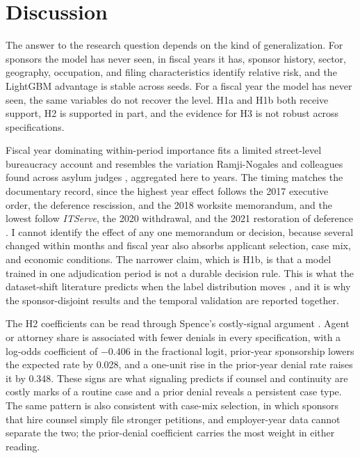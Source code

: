 \documentclass[9pt,twoside]{pnas-new}
\begin{document}
\FloatBarrier
\section*{Discussion}

The answer to the research question depends on the kind of generalization. For sponsors the model has never seen, in fiscal years it has, sponsor history, sector, geography, occupation, and filing characteristics identify relative risk, and the LightGBM advantage is stable across seeds. For a fiscal year the model has never seen, the same variables do not recover the level. H1a and H1b both receive support, H2 is supported in part, and the evidence for H3 is not robust across specifications.

Fiscal year dominating within-period importance fits a limited street-level bureaucracy account and resembles the variation Ramji-Nogales and colleagues found across asylum judges \cite{ramjinogales2007}, aggregated here to years. The timing matches the documentary record, since the highest year effect follows the 2017 executive order, the deference rescission, and the 2018 worksite memorandum, and the lowest follow \emph{ITServe}, the 2020 withdrawal, and the 2021 restoration of deference \cite{eo13788,uscis2017deference,uscis2018memo,itserve2020,uscis2020rescind,uscis2021deference}. I cannot identify the effect of any one memorandum or decision, because several changed within months and fiscal year also absorbs applicant selection, case mix, and economic conditions. The narrower claim, which is H1b, is that a model trained in one adjudication period is not a durable decision rule. This is what the dataset-shift literature predicts when the label distribution moves \cite{quinonero2009}, and it is why the sponsor-disjoint results and the temporal validation are reported together.

The H2 coefficients can be read through Spence's costly-signal argument \cite{spence1973}. Agent or attorney share is associated with fewer denials in every specification, with a log-odds coefficient of $-0.406$ in the fractional logit, prior-year sponsorship lowers the expected rate by 0.028, and a one-unit rise in the prior-year denial rate raises it by 0.348. These signs are what signaling predicts if counsel and continuity are costly marks of a routine case and a prior denial reveals a persistent case type. The same pattern is also consistent with case-mix selection, in which sponsors that hire counsel simply file stronger petitions, and employer-year data cannot separate the two; the prior-denial coefficient carries the most weight in either reading.
\end{document}
